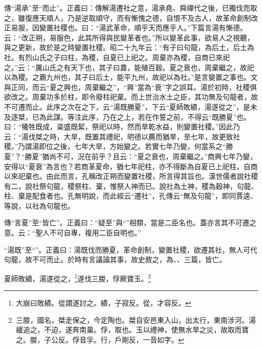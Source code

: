 {\noindent\zhuan{}\fzbyks 傳“湯承”至“而止”。正義曰：傳解湯遷社之意，湯承堯、舜禪代之後，已獨伐而取之，雖復應天順人，乃是逆取順守，而有慚愧之德，自恨不及古人，故革命創制改正易服，因變置社稷也。曰：“湯武革命，順乎天而應乎人。”下篇言湯有慚德。云：“改正朔，易服色，此其所得與民變革者也。”所以變革此事，欲易人之視聽，與之更新，故於是之時變置社稷。昭二十九年云：“有子曰句龍，為后土，后土為社。有烈山氏之子曰柱，為稷，自夏已上祀之。周棄亦為稷，自商已來祀之。”云：“厲山氏之有天下也，其子曰農，能殖百穀。夏之衰也，周棄繼之，故祀以為稷。之霸九州也，其子曰后土，能平九州，故祀以為社。”是言變置之事也。文與正同，而云“夏之興也，周棄繼之”，“興”當為“衰”字之誤耳。湯於初時，社稷俱欲改之。周棄功多於柱，即令廢柱祀棄。而上世治水土之臣，其功無及句龍者，故不可遷而止。此序之次在之下，云“湯既勝夏”，下云“夏師敗績，湯遂從之”，是未及逐桀，已為此謀。等注此序，乃在之上，若在作誓之前，不得云“既勝夏”也。曰：“犧牲既成，粢盛既絜，祭祀以時，然而旱乾水益，則變置社稷。”因此乃云：“湯伐桀之時，大旱，既置其禮祀，明德以薦而猶旱，至七年，故更致社稷。”乃謂湯即位之後，七年大旱，方始變之。若實七年乃變，何當系之“勝夏”？“勝夏”猶尚不可，況在前乎？且云：“夏之衰也，周棄繼之。”商興七年乃變，安得以“夏衰”為言也？若商革夏命，猶七年祀柱，亦不得斷為自夏已上祀柱，自商以來祀棄也。由此而言，孔稱改正朔而變置社稷，所言得其旨也。漢世儒者說社稷有二，說社祭句龍，稷祭柱、棄，惟祭人神而已。說社為土神，稷為穀神，句龍、柱、棄是配食者也。孔無明說，而此經云“遷社”，孔傳云“無及句龍”，即同賈逵、等說，以社為句龍也。 \par}

{\noindent\zhuan{}\fzbyks 傳“言夏”至“皆亡”。正義曰：“疑至”與“”相類，當是二臣名也。蓋亦言其不可遷之意。云：“聖人不可自專，複用二臣自明也。” \par}

{\noindent\shu{}\fzkt “湯既”至“”。正義曰：湯既伐而勝夏，革命創制，變置社稷，欲遷其社，無人可代句龍，故不可而止。於時有言議論其事，故史敘之，為、、三篇，皆亡。 \par}

夏師敗績，湯遂從之，\footnote{大崩曰敗績。從謂遂討之。績，子寂反。從，才容反。}遂伐三朡，俘厥寶玉。\footnote{三朡，國名，桀走保之，今定陶也。桀自安邑東入山，出太行，東南涉河。湯緩追之，不迫，遂奔南巢。俘，取也。玉以禮神，使無水旱之災，故取而寶之。朡，子公反。俘音孚。行，戶剛反，一音如字。}

